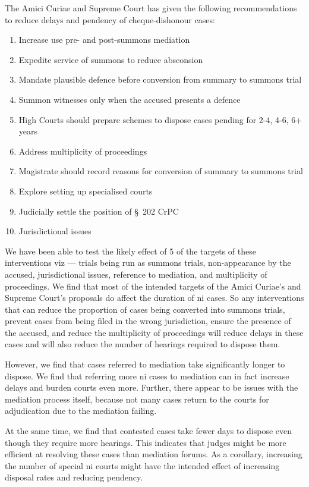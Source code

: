 The Amici Curiae and Supreme Court has given the following recommendations to reduce delays and pendency of cheque-dishonour cases:
\begin{enumerate}
\item Increase use pre- and post-summons mediation
\item Expedite service of summons to reduce absconsion
\item Mandate plausible defence before conversion from summary to summons trial
\item Summon witnesses only when the accused presents a defence
\item High Courts should prepare schemes to dispose cases pending for 2-4, 4-6, 6+ years
\item Address multiplicity of proceedings
\item Magistrate should record reasons for conversion of summary to summons trial
\item Explore setting up specialised courts
\item Judicially settle the position of \S~202 CrPC
\item Jurisdictional issues
\end{enumerate}

We have been able to test the likely effect of 5 of the targets of these interventions viz --- trials being run as summons trials, non-appearance by the accused, jurisdictional issues, reference to mediation, and multiplicity of proceedings. We find that most of the intended targets of the Amici Curiae's and Supreme Court's proposals do affect the duration of \gls{ni} cases. So any interventions that can reduce the proportion of cases being converted into summons trials, prevent cases from being filed in the wrong jurisdiction, ensure the presence of the accused, and reduce the multiplicity of proceedings will reduce delays in these cases and will also reduce the number of hearings required to dispose them.

However, we find that cases referred to mediation take significantly longer to dispose. We find that referring more \gls{ni} cases to mediation can in fact increase delays and burden courts even more. Further, there appear to be issues with the mediation process itself, because not many cases return to the courts for adjudication due to the mediation failing.

At the same time, we find that contested cases take fewer days to dispose even though they require more hearings. This indicates that judges might be more efficient at resolving these cases than mediation forums. As a corollary, increasing the number of special \gls{ni} courts might have the intended effect of increasing disposal rates and reducing pendency.

